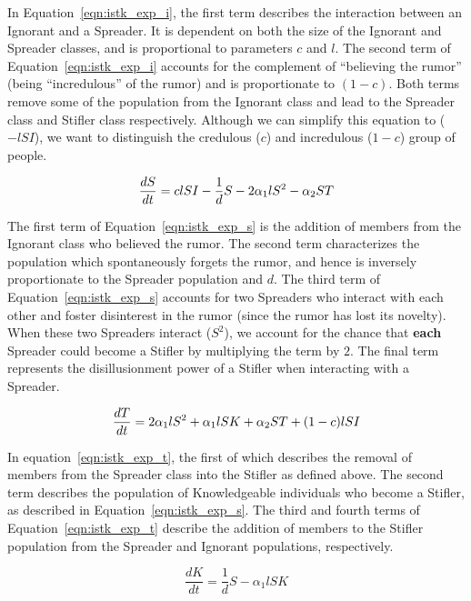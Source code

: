 In Equation~\ref{eqn:istk_exp_i}, the first term describes the interaction between an Ignorant and a Spreader.
It is dependent on both the size of the Ignorant and Spreader classes, and is proportional to parameters $ c $ and $ l $.
 The second term of Equation~\ref{eqn:istk_exp_i} accounts for the complement of ``believing the rumor'' (being ``incredulous'' of the rumor) and is proportionate to $ (1 - c) $.
Both terms remove some of the population from the Ignorant class and lead to the Spreader class and Stifler class respectively. Although we can simplify this equation to ($-lSI$), we want to distinguish the credulous ($ c $) and incredulous ($ 1 - c $) group of people.

\begin{equation}
\label{eqn:istk_exp_s} \frac{dS}{dt} = clSI - \frac{1}{d} S - 2 \alpha_1l S^2 - \alpha_2 ST \\
\end{equation}

The first term of Equation~\ref{eqn:istk_exp_s} is the addition of members from the Ignorant class who believed the rumor.
The second term characterizes the population which spontaneously forgets the rumor, and hence is inversely proportionate to the Spreader population and $ d $.
The third term of Equation~\ref{eqn:istk_exp_s} accounts for two Spreaders who interact with each other and foster disinterest in the rumor (since the rumor has lost its novelty).
When these two Spreaders interact ($S^2$), we account for the chance that \textbf{each} Spreader could become a Stifler by multiplying the term by $ 2 $.
The final term represents the disillusionment power of a Stifler when interacting with a Spreader.

\begin{equation}
\label{eqn:istk_exp_t} \frac{dT}{dt} =  2 \alpha_1l S^2 + \alpha_1l SK + \alpha_2 ST + (1-c)lSI \\
\end{equation}

In equation~\ref{eqn:istk_exp_t}, the first of which describes the removal of members from the Spreader class into the Stifler as defined above.
The second term describes the population of Knowledgeable individuals who become a Stifler, as described in Equation~\ref{eqn:istk_exp_s}.
The third and fourth terms of Equation~\ref{eqn:istk_exp_t} describe the addition of members to the Stifler population from the Spreader and Ignorant populations, respectively.

\begin{equation}
\label{eqn:istk_exp_k} \frac{dK}{dt} = \frac{1}{d}S - \alpha_1l SK
\end{equation}


